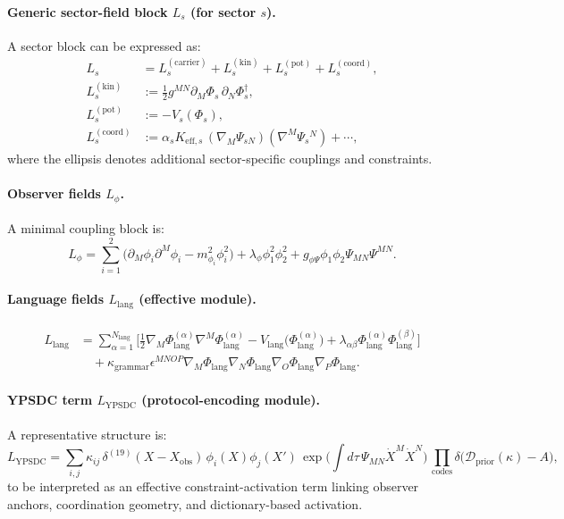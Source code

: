 \documentclass[13pt,a4paper]{article}
\begin{document}
	\paragraph{Generic sector-field block $L_s$ (for sector $s$).}
	A sector block can be expressed as:
	\begin{align}
		L_s &= L^{(\mathrm{carrier})}_s + L^{(\mathrm{kin})}_s + L^{(\mathrm{pot})}_s + L^{(\mathrm{coord})}_s, \\
		L^{(\mathrm{kin})}_s &:= \frac{1}{2}g^{MN}\partial_M\Phi_s\,\partial_N\Phi_s^\dagger, \\
		L^{(\mathrm{pot})}_s &:= -V_s(\Phi_s), \\
		L^{(\mathrm{coord})}_s &:= \alpha_s K_{\mathrm{eff},s}\,(\nabla_M\Psi_{sN})(\nabla^M\Psi_{s}{}^{N}) + \cdots,
	\end{align}
	where the ellipsis denotes additional sector-specific couplings and constraints.
	
	\paragraph{Observer fields $L_{\phi}$.}
	A minimal coupling block is:
	\begin{equation}
		L_{\phi}=\sum_{i=1}^{2}\Big(\partial_M\phi_i\partial^M\phi_i - m_{\phi_i}^2\phi_i^2\Big) + \lambda_{\phi}\phi_1^2\phi_2^2 + g_{\phi\Psi}\phi_1\phi_2\Psi_{MN}\Psi^{MN}.
	\end{equation}
	
	\paragraph{Language fields $L_{\mathrm{lang}}$ (effective module).}
	\begin{align}
		L_{\mathrm{lang}} &= \sum_{\alpha=1}^{N_{\mathrm{lang}}}\Big[
		\frac{1}{2}\nabla_M\Phi_{\mathrm{lang}}^{(\alpha)}\nabla^M\Phi_{\mathrm{lang}}^{(\alpha)}
		- V_{\mathrm{lang}}\big(\Phi_{\mathrm{lang}}^{(\alpha)}\big)
		+ \lambda_{\alpha\beta}\Phi_{\mathrm{lang}}^{(\alpha)}\Phi_{\mathrm{lang}}^{(\beta)}
		\Big] \nonumber\\
		&\quad + \kappa_{\mathrm{grammar}}\epsilon^{MNOP}\nabla_M\Phi_{\mathrm{lang}}\nabla_N\Phi_{\mathrm{lang}}\nabla_O\Phi_{\mathrm{lang}}\nabla_P\Phi_{\mathrm{lang}}.
	\end{align}
	
	\paragraph{YPSDC term $L_{\mathrm{YPSDC}}$ (protocol-encoding module).}
	A representative structure is:
	\begin{equation}
		L_{\mathrm{YPSDC}} = \sum_{i,j}\kappa_{ij}\,\delta^{(19)}(X-X_{\mathrm{obs}})\,\phi_i(X)\phi_j(X')\,
		\exp\!\Big(\int d\tau\,\Psi_{MN}\dot X^M\dot X^N\Big)\,
		\prod_{\mathrm{codes}}\delta\big(\mathcal{D}_{\mathrm{prior}}(\kappa)-A\big),
	\end{equation}
	to be interpreted as an effective constraint-activation term linking observer anchors, coordination geometry, and dictionary-based activation.
	
\end{document}
